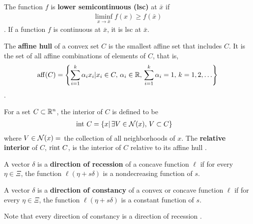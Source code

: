 


\begin{definition}
The function $f$ is \textbf{lower semicontinuous (lsc)} at $\bar{x}$ if
\begin{align*}
	\liminf_{x\to \bar{x}} f(x) \geq f(\bar{x})
\end{align*}
\citep[p8]{Rockafellar}.  If a function $f$ is continuous at $\bar{x}$, it is lsc at $\bar{x}$.
\end{definition}


\begin{definition}
The \textbf{affine hull} of a convex set $C$ is the smallest affine set that includes $C$.  It is the set of all affine combinations of elements of $C$, that is,
\begin{align*}
	\operatorname{aff}(C) = \left \{ \sum_{i=1}^{k} \alpha_i x_i | x_i \in C, \, \alpha_i \in {\mathbb R}, \, \sum_{i=1}^{k} \alpha_i = 1, \, k = 1, 2, \ldots \right \}
\end{align*}
\citep{Rockafellar}.
\end{definition}

\begin{definition}
For a set $C \subset {\mathbb R}^n$, the interior of $C$ is defined to be
\begin{align*}
	\operatorname{int} \, C &= \{ x | \, \exists V \in {\mathcal N}(x), \, V \subset C \} 
\end{align*}
	where $V \in {\mathcal N}(x) =$ the collection of all neighborhoods of $x$.  The \textbf{relative interior} of $C$, $\operatorname{rint} \, C$, is the interior of $C$ relative to its affine hull
\citep{Rockafellar}.
\end{definition}

\begin{definition}
A vector $\delta$ is a \textbf{direction of recession} of a concave function $\ell$ if for every $\eta \in \Xi$, the function $\ell(\eta + s \delta)$ is a nondecreasing function of $s$.

A vector $\delta$ is a \textbf{direction of constancy} of a convex or concave function $\ell$ if for every $\eta \in \Xi$, the function $\ell(\eta + s \delta)$ is a constant function of $s$.  

Note that every direction of constancy is a direction of recession
\citep{Geyer:2009}.
\end{definition}

